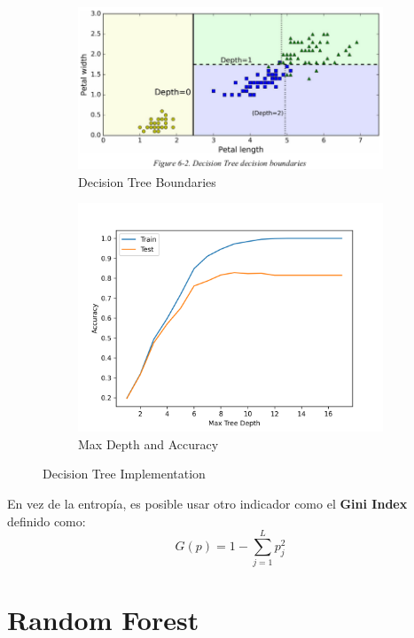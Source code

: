 \begin{figure}[H]
\begin{subfigure}{.5\textwidth}
    \center
    \includegraphics[scale=0.3]{notebooks/ML/img/decision_tree_data.png}
    \caption{Decision Tree Boundaries}
\end{subfigure}%
\begin{subfigure}{.5\textwidth}
    \center
    \includegraphics[scale=0.4]{notebooks/ML/img/max_depth_decision_tree.png}
    \caption{Max Depth and Accuracy}
\end{subfigure}
\caption{Decision Tree Implementation}
\label{fig:fig}
\end{figure}

En vez de la entropía, es posible usar otro indicador como el \textbf{Gini Index} definido como: 
$$G(p) = 1 - \sum_{j=1}^L p_j^2$$

\section{Random Forest}

